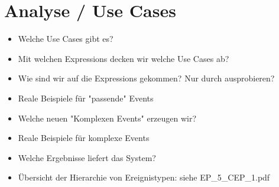 \section{Analyse / Use Cases}
\begin{itemize}
    \item Welche Use Cases gibt es?
    \item Mit welchen Expressions decken wir welche Use Cases ab?
    \item Wie sind wir auf die Expressions gekommen? Nur durch ausprobieren?
    \item Reale Beispiele für "passende" Events
    \item Welche neuen "Komplexen Events" erzeugen wir?
    \item Reale Beispiele für komplexe Events
    \item Welche Ergebnisse liefert das System?
    \item Übersicht der Hierarchie von Ereignistypen: siehe EP_5_CEP_1.pdf
\end{itemize}